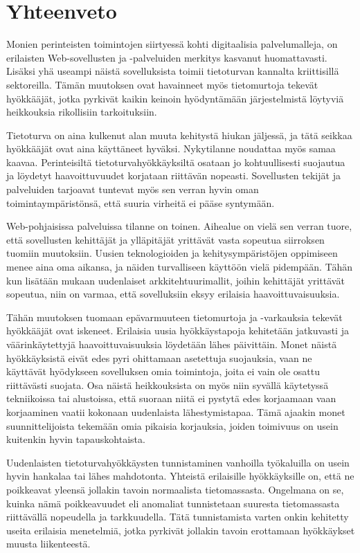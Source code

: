 
\chapter{Yhteenveto}

Monien perinteisten toimintojen siirtyessä kohti digitaalisia palvelumalleja, on erilaisten 
Web-sovellusten ja -palveluiden merkitys kasvanut huomattavasti. Lisäksi yhä useampi näistä sovelluksista
toimii tietoturvan kannalta kriittisillä sektoreilla.
Tämän muutoksen ovat havainneet myös tietomurtoja tekevät hyökkääjät, jotka pyrkivät kaikin
keinoin hyödyntämään järjestelmistä löytyviä heikkouksia rikollisiin tarkoituksiin.

Tietoturva on aina kulkenut alan muuta kehitystä hiukan jäljessä, ja tätä seikkaa hyökkääjät
ovat aina käyttäneet hyväksi. Nykytilanne noudattaa myös samaa kaavaa. Perinteisiltä
tietoturvahyökkäyksiltä osataan jo kohtuullisesti suojautua ja löydetyt haavoittuvuudet
korjataan riittävän nopeasti. Sovellusten tekijät ja palveluiden tarjoavat tuntevat
myös sen verran hyvin oman toimintaympäristönsä, että suuria virheitä ei pääse syntymään.

Web-pohjaisissa palveluissa tilanne on toinen. Aihealue on vielä sen verran tuore,
että sovellusten kehittäjät ja ylläpitäjät yrittävät vasta sopeutua siirroksen
tuomiin muutoksiin. Uusien teknologioiden ja kehitysympäristöjen oppimiseen
menee aina oma aikansa, ja näiden turvalliseen käyttöön vielä pidempään. 
Tähän kun lisätään mukaan uudenlaiset arkkitehtuurimallit, joihin kehittäjät yrittävät 
sopeutua, niin on varmaa, että sovelluksiin eksyy erilaisia haavoittuvaisuuksia.

Tähän muutoksen tuomaan epävarmuuteen tietomurtoja ja -varkauksia tekevät hyökkääjät ovat iskeneet. 
Erilaisia uusia hyökkäystapoja kehitetään jatkuvasti ja väärinkäytettyjä haavoittuvaisuuksia löydetään lähes päivittäin.
Monet näistä hyökkäyksistä eivät edes pyri ohittamaan asetettuja suojauksia, vaan ne käyttävät hyödykseen
sovelluksen omia toimintoja, joita ei vain ole osattu riittävästi suojata. Osa näistä heikkouksista on 
myös niin syvällä käytetyssä tekniikoissa tai alustoissa, että suoraan niitä ei pystytä edes korjaamaan vaan
korjaaminen vaatii kokonaan uudenlaista lähestymistapaa. Tämä ajaakin monet suunnittelijoista tekemään
omia pikaisia korjauksia, joiden toimivuus on usein kuitenkin hyvin tapauskohtaista. 

Uudenlaisten tietoturvahyökkäysten tunnistaminen vanhoilla työkaluilla on usein hyvin hankalaa tai
lähes mahdotonta. Yhteistä erilaisille hyökkäyksille on, että ne poikkeavat yleensä jollakin tavoin normaalista
tietomassasta. Ongelmana on se, kuinka nämä poikkeavuudet eli anomaliat tunnistetaan suuresta tietomassasta
riittävällä nopeudella ja tarkkuudella. Tätä tunnistamista varten onkin kehitetty useita erilaisia menetelmiä,
jotka pyrkivät jollakin tavoin erottamaan hyökkäykset muusta liikenteestä. 

